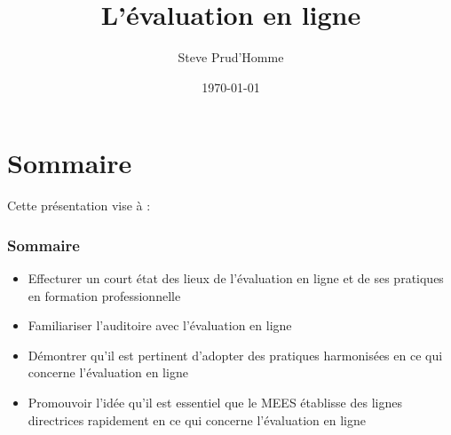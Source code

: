 \documentclass[aspectratio=169]{beamer}
\begin{document}
	\title{L'évaluation en ligne} 
	\author{Steve Prud'Homme} 
	\date{\today} 

	
	
	\frame{\titlepage} 
	\usebackgroundtemplate{ } 
	\section{Sommaire} 
		\begin{frame}
			Cette présentation vise à : 
			\frametitle{Sommaire}
			\begin {itemize}
				\item Effecturer un court état des lieux de l'évaluation en ligne et de ses pratiques en formation professionnelle
				\item Familiariser l'auditoire avec l'évaluation en ligne 
				\item Démontrer qu'il est pertinent d'adopter des pratiques harmonisées en ce qui concerne l'évaluation en ligne
				\item Promouvoir l'idée qu'il est essentiel que le MEES établisse des lignes directrices rapidement en ce qui concerne l'évaluation en ligne

			\end{itemize}
		\end{frame}
\end{document}
